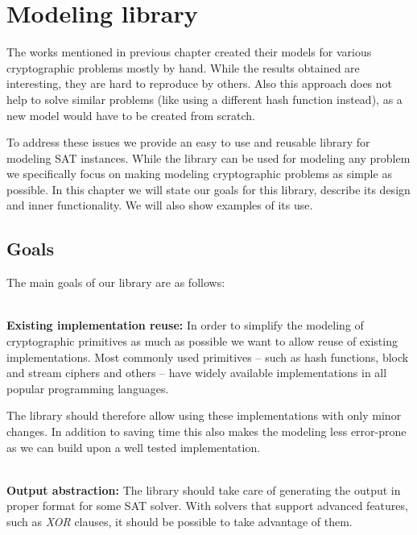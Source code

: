 \chapter{Modeling library}

The works mentioned in previous chapter created their models for various cryptographic problems mostly by hand.
While the results obtained are interesting, they are hard to reproduce by others.
Also this approach does not help to solve similar problems (like using a different hash function instead), as a new model would have to be created from scratch.

To address these issues we provide an easy to use and reusable library for modeling SAT instances.
While the library can be used for modeling any problem we specifically focus on making modeling cryptographic problems as simple as possible.
In this chapter we will state our goals for this library, describe its design and inner functionality.
We will also show examples of its use.

\section{Goals}
The main goals of our library are as follows:

~\\
\textbf{Existing implementation reuse:}
In order to simplify the modeling of cryptographic primitives as much as possible we want to allow reuse of existing implementations.
Most commonly used primitives -- such as hash functions, block and stream ciphers and others -- have widely available implementations in all popular programming languages.

The library should therefore allow using these implementations with only minor changes.
In addition to saving time this also makes the modeling less error-prone as we can build upon a well tested implementation.

~\\
\textbf{Output abstraction:}
The library should take care of generating the output in proper format for some SAT solver.
With solvers that support advanced features, such as \emph{XOR} clauses, it should be possible to take advantage of them.

